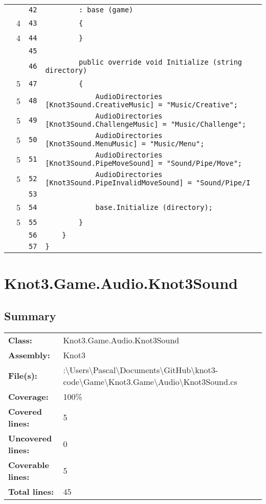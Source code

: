 \documentclass[a4paper,10pt]{article}
\begin{document}
\begin{longtable}[l]{lrrl}
\cellcolor{gray} &  & \verb~42~ & \verb~        : base (game)~\\
\cellcolor{green} & 4 & \verb~43~ & \verb~        {~\\
\cellcolor{green} & 4 & \verb~44~ & \verb~        }~\\
\cellcolor{gray} &  & \verb~45~ & \verb~~\\
\cellcolor{gray} &  & \verb~46~ & \verb~        public override void Initialize (string directory)~\\
\cellcolor{green} & 5 & \verb~47~ & \verb~        {~\\
\cellcolor{green} & 5 & \verb~48~ & \verb~            AudioDirectories [Knot3Sound.CreativeMusic] = "Music/Creative";~\\
\cellcolor{green} & 5 & \verb~49~ & \verb~            AudioDirectories [Knot3Sound.ChallengeMusic] = "Music/Challenge";~\\
\cellcolor{green} & 5 & \verb~50~ & \verb~            AudioDirectories [Knot3Sound.MenuMusic] = "Music/Menu";~\\
\cellcolor{green} & 5 & \verb~51~ & \verb~            AudioDirectories [Knot3Sound.PipeMoveSound] = "Sound/Pipe/Move";~\\
\cellcolor{green} & 5 & \verb~52~ & \verb~            AudioDirectories [Knot3Sound.PipeInvalidMoveSound] = "Sound/Pipe/I~\\
\cellcolor{gray} &  & \verb~53~ & \verb~~\\
\cellcolor{green} & 5 & \verb~54~ & \verb~            base.Initialize (directory);~\\
\cellcolor{green} & 5 & \verb~55~ & \verb~        }~\\
\cellcolor{gray} &  & \verb~56~ & \verb~    }~\\
\cellcolor{gray} &  & \verb~57~ & \verb~}~\\
\end{longtable}
\newpage
\section{Knot3.Game.Audio.Knot3Sound}
\subsection{Summary}
\begin{longtable}[l]{ll}
\textbf{Class:} & Knot3.Game.Audio.Knot3Sound\\
\textbf{Assembly:} & Knot3\\
\textbf{File(s):} & \begin{minipage}[t]{12cm}{:\textbackslash Users\textbackslash Pascal\textbackslash Documents\textbackslash GitHub\textbackslash knot3-code\textbackslash Game\textbackslash Knot3.Game\textbackslash Audio\textbackslash Knot3Sound.cs}\end{minipage} \\
\textbf{Coverage:} & 100\%\\
\textbf{Covered lines:} & 5\\
\textbf{Uncovered lines:} & 0\\
\textbf{Coverable lines:} & 5\\
\textbf{Total lines:} & 45\\
\end{longtable}
\end{document}
